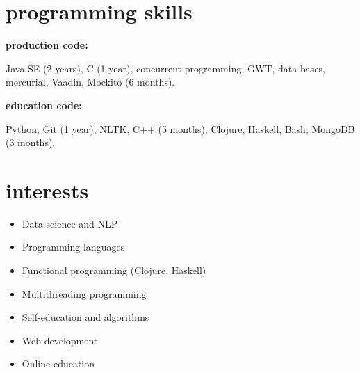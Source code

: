 \documentclass[]{friggeri-cv} %
\begin{document}
%

\section{programming skills}
\textbf{production code:}

Java SE (2 years), C (1 year), concurrent programming, GWT,
data bases, mercurial, Vaadin, Mockito (6 months).

\textbf{education code:}

Python, Git (1 year), NLTK, C++ (5 months), Clojure, Haskell, Bash, MongoDB (3 months).

\section{interests}

\begin{itemize}
  \item Data science and NLP
  \item Programming languages
  \item Functional programming (Clojure, Haskell)
  \item Multithreading programming
  \item Self-education and algorithms
  \item Web development
  \item Online education

\end{itemize}
\end{document}
